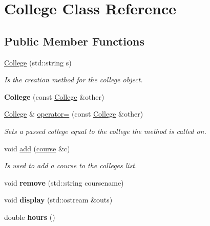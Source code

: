 \hypertarget{classCollege}{}\section{College Class Reference}
\label{classCollege}
\subsection*{Public Member Functions}
\begin{DoxyCompactItemize}
\item 
\hyperlink{classCollege_adabaf4087355e83f9f7d39f1e1498b41}{College} (std\+::string s)
\begin{DoxyCompactList}\small\item\em Is the creation method for the college object. \end{DoxyCompactList}\item 
{\bfseries College} (const \hyperlink{classCollege}{College} \&other)\hypertarget{classCollege_ad007ad488e5a7ef986114080d0c8e101}{}\label{classCollege_ad007ad488e5a7ef986114080d0c8e101}

\item 
\hyperlink{classCollege}{College} \& \hyperlink{classCollege_af2194c9b37f80d13dc3fdba6784b18e8}{operator=} (const \hyperlink{classCollege}{College} \&other)
\begin{DoxyCompactList}\small\item\em Sets a passed college equal to the college the method is called on. \end{DoxyCompactList}\item 
void \hyperlink{classCollege_a67fd1d8970b46b24ce2e0dd72598a22f}{add} (\hyperlink{classcourse}{course} \&c)
\begin{DoxyCompactList}\small\item\em Is used to add a course to the colleges list. \end{DoxyCompactList}\item 
void {\bfseries remove} (std\+::string coursename)\hypertarget{classCollege_a4d2ae513b36e6421fb1ca2c08459cfe6}{}\label{classCollege_a4d2ae513b36e6421fb1ca2c08459cfe6}

\item 
void {\bfseries display} (std\+::ostream \&outs)\hypertarget{classCollege_a52ca0a164483cf5c05591cd0fb8b300c}{}\label{classCollege_a52ca0a164483cf5c05591cd0fb8b300c}

\item 
double {\bfseries hours} ()\hypertarget{classCollege_a8a7a762611a1d7e00c453390d49355fd}{}\label{classCollege_a8a7a762611a1d7e00c453390d49355fd}


\end{DoxyCompactItemize}
